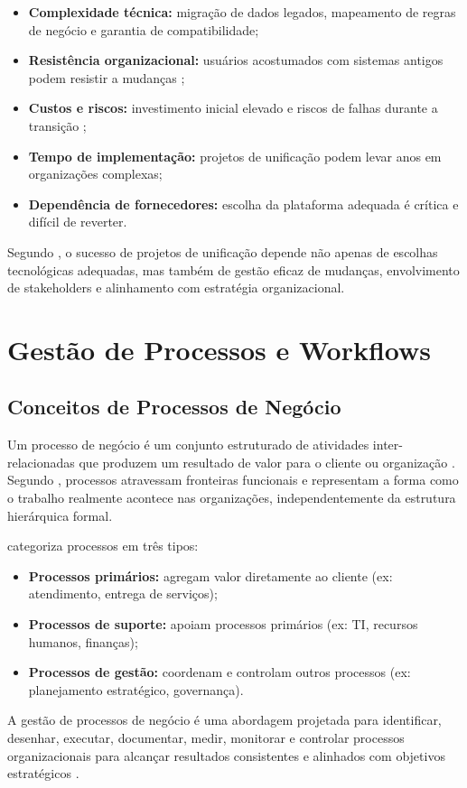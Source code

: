 \begin{itemize}
    \item \textbf{Complexidade técnica:} migração de dados legados, mapeamento de regras de negócio e garantia de compatibilidade;
    \item \textbf{Resistência organizacional:} usuários acostumados com sistemas antigos podem resistir a mudanças \cite{kotter1996};
    \item \textbf{Custos e riscos:} investimento inicial elevado e riscos de falhas durante a transição \cite{laudon2020};
    \item \textbf{Tempo de implementação:} projetos de unificação podem levar anos em organizações complexas;
    \item \textbf{Dependência de fornecedores:} escolha da plataforma adequada é crítica e difícil de reverter.
\end{itemize}

Segundo \cite{markus2000}, o sucesso de projetos de unificação depende não apenas de escolhas tecnológicas adequadas, mas também de gestão eficaz de mudanças, envolvimento de stakeholders e alinhamento com estratégia organizacional.
\section{Gestão de Processos e Workflows}

\subsection{Conceitos de Processos de Negócio}

Um processo de negócio é um conjunto estruturado de atividades inter-relacionadas que produzem um resultado de valor para o cliente ou organização \cite{davenport1993}. Segundo \cite{hammer2001}, processos atravessam fronteiras funcionais e representam a forma como o trabalho realmente acontece nas organizações, independentemente da estrutura hierárquica formal.

\cite{vom2007} categoriza processos em três tipos:

\begin{itemize}
    \item \textbf{Processos primários:} agregam valor diretamente ao cliente (ex: atendimento, entrega de serviços);
    \item \textbf{Processos de suporte:} apoiam processos primários (ex: TI, recursos humanos, finanças);
    \item \textbf{Processos de gestão:} coordenam e controlam outros processos (ex: planejamento estratégico, governança).
\end{itemize}
A gestão de processos de negócio é uma abordagem projetada para identificar, desenhar, executar, documentar, medir, monitorar e controlar processos organizacionais para alcançar resultados consistentes e alinhados com objetivos estratégicos \cite{vom2013}.
